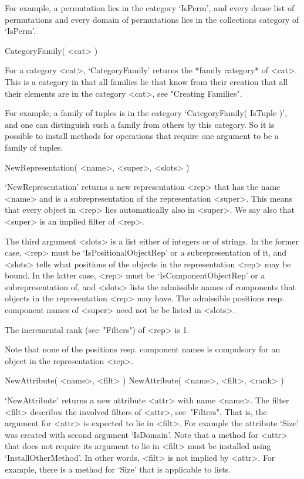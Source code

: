 For example, a permutation lies in the category `IsPerm',
and every dense list of permutations and every domain of permutations
lies in the collections category of `IsPerm'.

\>CategoryFamily( <cat> )

For a category <cat>,
`CategoryFamily' returns the *family category* of <cat>.
This is a category in that all families lie that know from their
creation that all their elements are in the category <cat>,
see "Creating Families".

For example, a family of tuples is in the category
`CategoryFamily( IsTuple )',
and one can distinguish such a family from others by this category.
So it is possible to install methods for operations that require one
argument to be a family of tuples.



\>NewRepresentation( <name>, <super>, <slots> )

`NewRepresentation' returns a new representation <rep> that has the name
<name> and is a subrepresentation of the representation <super>.
This means that every object in <rep> lies automatically also in <super>.
We say also that <super> is an implied filter of <rep>.

The third argument <slots> is a list either of integers or of strings.
In the former case, <rep> must be `IsPositionalObjectRep' or a
subrepresentation of it, and <slots> tells what positions of the objects
in the representation <rep> may be bound.
In the latter case, <rep> must be `IsComponentObjectRep' or a
subrepresentation of, and <slots> lists the admissible names of
components that objects in the representation <rep> may have.
The admissible positions resp. component names of <super> need not be
be listed in <slots>.

The incremental rank (see~"Filters") of <rep> is 1.

Note that none of the positions resp. component names is compulsory for
an object in the representation <rep>.



\>NewAttribute( <name>, <filt> )
\)NewAttribute( <name>, <filt>, <rank> )

`NewAttribute' returns a new attribute <attr> with name <name>.
The filter <filt> describes the involved filters of <attr>,
see~"Filters".
That is, the argument for <attr> is expected to lie in <filt>.
For example the attribute `Size' was created with second argument
`IsDomain'.
Note that a method for <attr> that does not require its argument to lie
in <filt> must be installed using `InstallOtherMethod'.
In other words, <filt> is not implied by <attr>.
For example, there is a method for `Size' that is applicable to lists.

